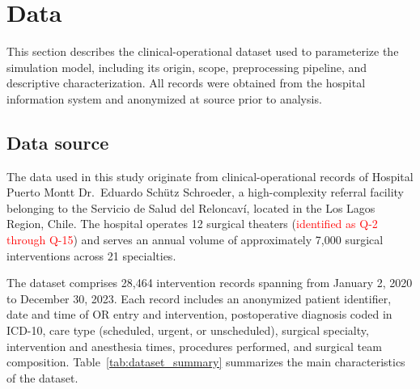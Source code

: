 \documentclass[sn-mathphys-num]{sn-jnl}
\begin{document}
\section{Data}\label{sec:data}

This section describes the clinical-operational dataset used to
parameterize the simulation model, including its origin, scope,
preprocessing pipeline, and descriptive characterization. All records
were obtained from the hospital information system and anonymized at
source prior to analysis.

\subsection{Data source}\label{data}

The data used in this study originate from clinical-operational records
of Hospital Puerto Montt Dr.\ Eduardo Schütz Schroeder, a
high-complexity referral facility belonging to the Servicio de Salud
del Reloncaví, located in the Los Lagos Region, Chile. The hospital
operates 12 surgical theaters (\textcolor{red}{identified as Q-2 through Q-15}) and
serves an annual volume of approximately 7{,}000 surgical interventions
across 21 specialties.

The dataset comprises 28{,}464 intervention records spanning from
January 2, 2020 to December 30, 2023. Each record includes an
anonymized patient identifier, date and time of OR entry and
intervention, postoperative diagnosis coded in ICD-10, care type
(scheduled, urgent, or unscheduled), surgical specialty, intervention
and anesthesia times, procedures performed, and surgical team
composition. Table~\ref{tab:dataset_summary} summarizes the main
characteristics of the dataset.
\end{document}
